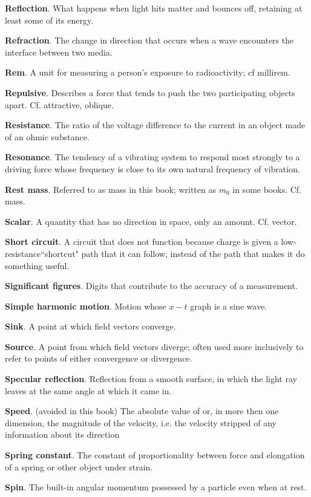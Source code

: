 \textbf{Reflection}. What happens when light hits matter and bounces off, retaining at least some of its
energy. 

\textbf{Refraction}. The change in direction that occurs when a wave encounters the interface between two
media. 

\textbf{Rem}.  A unit for measuring a person's exposure to radioactivity; cf millirem. 

\textbf{Repulsive}. Describes a force that tends to push the two participating objects apart. Cf. attractive,
oblique. 

\textbf{Resistance}. The ratio of the voltage difference to the current in an object made of an ohmic
substance. 

\textbf{Resonance}. The tendency of a vibrating system to respond most strongly to a driving force whose
frequency is
close to its own natural frequency of vibration. 

\textbf{Rest mass}. Referred to as mass in this book; written as $m_0$ in some books. Cf. mass.

\textbf{Scalar}. A quantity that has no direction in space, only an amount. Cf. vector.

\textbf{Short circuit}. A circuit that does not function because charge is given a low-resistance``shortcut"
path that it can follow, instead of the path that makes it do something useful. 

\textbf{Significant figures}. Digits that contribute to the accuracy of a measurement.

\textbf{Simple harmonic motion}. Motion whose $x-t$ graph is a sine wave. 

\textbf{Sink}. A point at which field vectors converge. 

\textbf{Source}. A point from which field vectors diverge; often used more inclusively to refer to points of
either convergence or divergence. 

\textbf{Specular reflection}. Reflection from a smooth surface, in which the light ray leaves at the same
angle at which it came in. 

\textbf{Speed}. (avoided in this book) The absolute value of or, in more then one dimension, the magnitude of
the
velocity, i.e. the velocity stripped of any information about its direction

\textbf{Spring constant}. The constant of proportionality between force and elongation of a spring or other
object under
strain. 

\textbf{Spin}. The built-in angular momentum possessed by a particle even when at rest.

